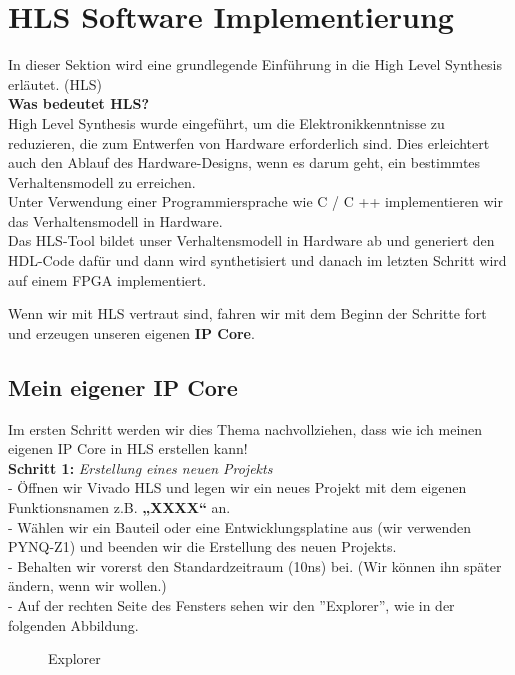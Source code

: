 \documentclass[a4paper]{report}
\begin{document}
\section{HLS Software Implementierung}
In dieser Sektion wird eine grundlegende Einführung in die High Level Synthesis erläutet. (HLS)\\
 \textbf{Was bedeutet HLS?}\\
 High Level Synthesis wurde eingeführt, um die Elektronikkenntnisse zu reduzieren, die zum Entwerfen von Hardware erforderlich sind. Dies erleichtert auch den Ablauf des Hardware-Designs, wenn es darum geht, ein bestimmtes Verhaltensmodell zu erreichen.\\
 Unter Verwendung einer Programmiersprache wie C / C ++ implementieren wir das Verhaltensmodell in Hardware. \\
 Das HLS-Tool bildet unser Verhaltensmodell in Hardware ab und generiert den HDL-Code dafür und dann wird synthetisiert und danach im letzten Schritt wird  auf einem FPGA implementiert.


Wenn wir mit HLS vertraut sind, fahren wir mit dem Beginn der Schritte fort und erzeugen unseren eigenen \textbf{IP Core}.
\subsection{Mein eigener IP Core}
Im ersten Schritt werden wir dies Thema nachvollziehen, dass wie ich meinen eigenen IP Core in HLS  erstellen kann!\\


\textbf{Schritt 1:} \textit{Erstellung eines neuen Projekts}\\

- Öffnen wir Vivado HLS und legen wir ein neues Projekt mit dem eigenen Funktionsnamen z.B. \textbf{„XXXX“} an.\\

- Wählen wir ein Bauteil oder eine Entwicklungsplatine aus (wir verwenden PYNQ-Z1) und beenden wir die Erstellung des neuen Projekts.\\

- Behalten wir vorerst den Standardzeitraum (10ns) bei. (Wir können ihn später ändern, wenn wir wollen.)\\

- Auf der rechten Seite des Fensters sehen wir den ''Explorer'', wie in der folgenden Abbildung.\\

\begin{figure}[H]
\centering
{}
\caption{Explorer}
\label{fig:Explorer}
\end{figure}
\end{document}
